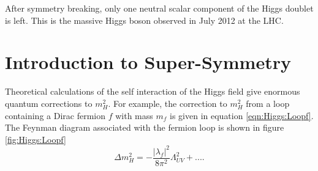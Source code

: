 \indent After symmetry breaking, only one neutral scalar component of the Higgs doublet is left.  This is the massive Higgs boson observed in July 2012 at the LHC.  \\

\section{Introduction to Super-Symmetry}
\label{Theory:QFT}


\indent Theoretical calculations of the self interaction of the Higgs field give enormous quantum corrections to $m_H^2$.\cite{MartinSUSY}  For example, the correction to $m_H^2$ from a loop containing a Dirac fermion $f$ with mass $m_f$ is given in equation \ref{eqn:Higgs:Loopf}.  The Feynman diagram associated with the fermion loop is shown in figure \ref{fig:Higgs:Loopf} \\

\begin{equation}
\label{eqn:Higgs:Loopf}
\Delta m_H^2 = - \frac{|\lambda_f|^2}{8\pi^2}\Lambda^2_{UV} + ....
\end{equation}

